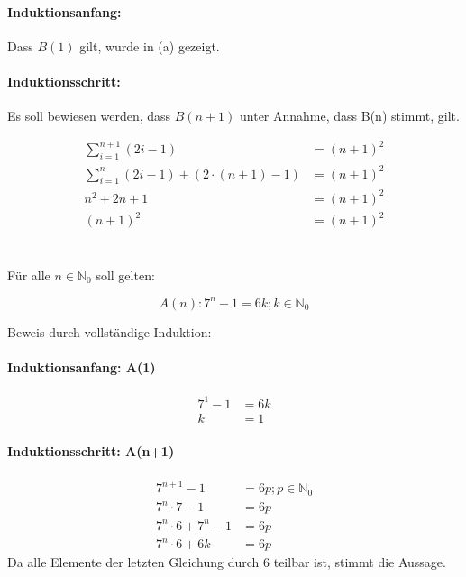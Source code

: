 \documentclass[11pt,a4paper]{article}
\begin{document}
\paragraph{Induktionsanfang:}
Dass $B(1)$ gilt, wurde in (a) gezeigt.

\paragraph{Induktionsschritt:}
Es soll bewiesen werden, dass $B(n+1)$ unter Annahme, dass B(n) stimmt, gilt.

\begin{align*}
    \sum_{i=1}^{n+1}{(2i-1)} &= (n+1)^2\\
    \sum_{i=1}^{n}{(2i-1)} + (2 \cdot (n+1) - 1) &= (n+1)^2\\
    n^2 + 2n +1 &= (n+1)^2\\
    (n+1)^2 &= (n+1)^2 \tag*{\checkmark}
\end{align*}

\section{}

Für alle $n \in \mathbb{N}_0$ soll gelten:

\begin{equation*}
A(n): 7^n-1 = 6k; k \in \mathbb{N}_0
\end{equation*}

Beweis durch vollständige Induktion:

\paragraph{Induktionsanfang: A(1)}
\begin{align*}
7^1-1 &= 6k\\
k &= 1 \tag*{\checkmark}
\end{align*}

\paragraph{Induktionsschritt: A(n+1)}
\begin{align*}
7^{n+1}-1 &= 6p; p \in \mathbb{N}_0\\
7^n \cdot 7 - 1 &= 6p\\
7^n \cdot 6 + 7^n - 1 &= 6p\\
7^n \cdot 6 + 6k &= 6p \tag*{\checkmark}
\end{align*}
Da alle Elemente der letzten Gleichung durch $6$ teilbar ist, stimmt die Aussage.
\end{document}
